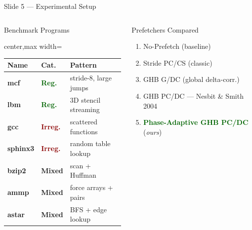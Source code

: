 \documentclass[aspectratio=169,t]{beamer}
\newcommand{\good}[1]{\textcolor{darkgreen}{\textbf{#1}}}
\newcommand{\bad}[1]{\textcolor{darkred}{\textbf{#1}}}
\newcommand{\hl}[1]{\textcolor{iitgold}{\textbf{#1}}}
\begin{document}
\begin{frame}[shrink=12]{Slide 5 --- Experimental Setup}
\begin{columns}[T,totalwidth=\textwidth]
\begin{block}{Benchmark Programs}
\footnotesize\setlength{\tabcolsep}{3pt}
\centering
\begin{adjustbox}{center,max width=\linewidth}
\begin{tabular}{@{}lll@{}}
\toprule
\textbf{Name} & \textbf{Cat.} & \textbf{Pattern}\\
\midrule
\textbf{mcf}     & \good{Reg.}  & stride-8, large jumps\\
\textbf{lbm}     & \good{Reg.}  & 3D stencil streaming\\
\textbf{gcc}     & \bad{Irreg.} & scattered functions\\
\textbf{sphinx3} & \bad{Irreg.} & random table lookup\\
\textbf{bzip2}   & \hl{Mixed}   & scan + Huffman\\
\textbf{ammp}    & \hl{Mixed}   & force arrays + pairs\\
\textbf{astar}   & \hl{Mixed}   & BFS + edge lookup\\
\bottomrule
\end{tabular}
\end{adjustbox}
\end{block}
\begin{block}{Prefetchers Compared}
\footnotesize
\begin{enumerate}\setlength\itemsep{0pt}
  \item No-Prefetch (baseline)
  \item Stride PC/CS (classic)
  \item GHB G/DC (global delta-corr.)
  \item GHB PC/DC --- Nesbit \& Smith 2004
  \item \textbf{\good{Phase-Adaptive GHB PC/DC}} (\textit{ours})
\end{enumerate}
\end{block}
\end{columns}
\end{frame}

\end{document}

